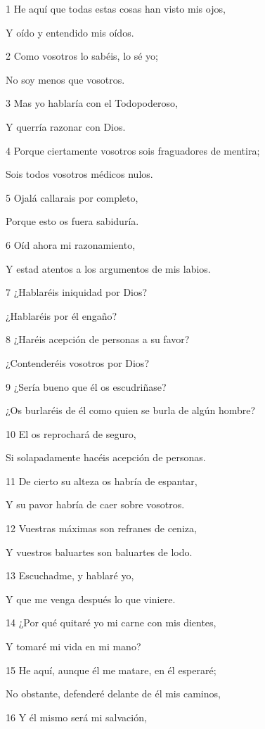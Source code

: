 \par 1 He aquí que todas estas cosas han visto mis ojos,
\par Y oído y entendido mis oídos.
\par 2 Como vosotros lo sabéis, lo sé yo;
\par No soy menos que vosotros.
\par 3 Mas yo hablaría con el Todopoderoso,
\par Y querría razonar con Dios.
\par 4 Porque ciertamente vosotros sois fraguadores de mentira;
\par Sois todos vosotros médicos nulos.
\par 5 Ojalá callarais por completo,
\par Porque esto os fuera sabiduría.
\par 6 Oíd ahora mi razonamiento,
\par Y estad atentos a los argumentos de mis labios. 
\par 7 ¿Hablaréis iniquidad por Dios?
\par ¿Hablaréis por él engaño?
\par 8 ¿Haréis acepción de personas a su favor?
\par ¿Contenderéis vosotros por Dios?
\par 9 ¿Sería bueno que él os escudriñase?
\par ¿Os burlaréis de él como quien se burla de algún hombre?
\par 10 El os reprochará de seguro,
\par Si solapadamente hacéis acepción de personas.
\par 11 De cierto su alteza os habría de espantar,
\par Y su pavor habría de caer sobre vosotros.
\par 12 Vuestras máximas son refranes de ceniza,
\par Y vuestros baluartes son baluartes de lodo.
\par 13 Escuchadme, y hablaré yo,
\par Y que me venga después lo que viniere.
\par 14 ¿Por qué quitaré yo mi carne con mis dientes,
\par Y tomaré mi vida en mi mano?
\par 15 He aquí, aunque él me matare, en él esperaré;
\par No obstante, defenderé delante de él mis caminos,
\par 16 Y él mismo será mi salvación,
